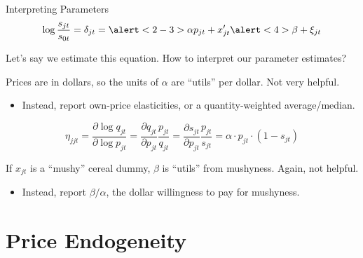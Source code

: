 \documentclass[aspectratio=169,t,11pt,table]{beamer}
\begin{document}
\begin{frame}{Interpreting Parameters}
    \vspace{-\baselineskip}
    \begin{equation*}
        \log\frac{s_{jt}}{s_{0t}} = \delta_{jt} = \alert<2-3>{\alpha} p_{jt} + x_{jt}'\alert<4>{\beta} + \xi_{jt}
    \end{equation*}
    \vspace{-0.5\baselineskip}
    \begin{wideitemize}
        \item Let's say we estimate this equation. How to interpret our parameter estimates?
        \pause
        \item Prices are in dollars, so the units of $\alpha$ are ``utils'' per dollar. Not very helpful.
        \pause
        \begin{itemize}
            \item Instead, report own-price elasticities, or a quantity-weighted average/median.
        \end{itemize}
        \vspace{\baselineskip}
        \begin{equation*}
            \eta_{jjt} = \frac{\partial\log q_{jt}}{\partial\log p_{jt}} = \frac{\partial q_{jt}}{\partial p_{jt}} \frac{p_{jt}}{q_{jt}} = \frac{\partial s_{jt}}{\partial p_{jt}} \frac{p_{jt}}{s_{jt}} = \alpha \cdot p_{jt} \cdot (1 - s_{jt})
        \end{equation*}
        \vspace{-0.5\baselineskip}
        \pause
        \item If $x_{jt}$ is a ``mushy'' cereal dummy, $\beta$ is ``utils'' from mushyness. Again, not helpful.
        \pause
        \begin{itemize}
            \item Instead, report $\beta / \alpha$, the dollar willingness to pay for mushyness.
        \end{itemize}
    \end{wideitemize}
\end{frame}

\section{Price Endogeneity}
\end{document}
